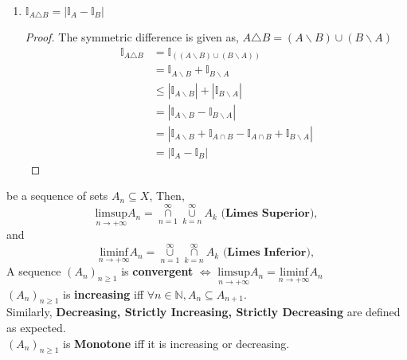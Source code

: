 \documentclass[letterpaper, 12pt]{article}
\newcommand{\1}{\mathds{1}}	%
\theoremstyle{definition}
\begin{document}
{\begin{enumerate}
\begin{proof}
\begin{align*}
            &= \mathds{I}_{A} (1 - \mathds{I}_{B}
        \end{align*}
    \end{proof}
    \item $\mathds{I}_{A \triangle B} = |\mathds{I}_{A} - \mathds{I}_{B}|$
    \begin{proof}
        The symmetric difference is given as, $A \triangle B = (A \backslash B) \cup (B \backslash A)$ 
        \begin{align*}
            \mathds{I}_{A \triangle B} &= \mathds{I}_{((A \backslash B) \cup (B \backslash A))} \\
            &=\mathds{I}_{A \backslash B} + \mathds{I}_{B \backslash A} \\
            &\leq |\mathds{I}_{A \backslash B}| + |\mathds{I}_{B \backslash A}| \\
            &=|\mathds{I}_{A \backslash B} - \mathds{I}_{B \backslash A}| \\
            &=|\mathds{I}_{A \backslash B} + \mathds{I}_{A \cap B} - \mathds{I}_{A \cap B} + \mathds{I}_{B \backslash A}| \\
            &=|\mathds{I}_{A} - \mathds{I}_{B}|
        \end{align*}
    \end{proof}
\end{enumerate}

 be a sequence of sets $A_n \subseteq X$, Then, \[\underset{n \to +\infty}{\mathrm{lim sup}} A_n = \overset{\infty}{ \underset{n=1}{\cap}} \overset{\infty}{ \underset{k=n}{\cup}} A_{k} \textbf{ (Limes Superior}),\]
and 
\[\underset{n \to +\infty}{\mathrm{lim inf}} A_n = \overset{\infty}{ \underset{n=1}{\cup}} \overset{\infty}{ \underset{k=n}{\cap}} A_{k} \textbf{ (Limes Inferior}),\]
A sequence $(A_n)_{n \geq 1}$ is \textbf{convergent} $\Longleftrightarrow$ $\underset{n \to +\infty}{\mathrm{lim sup}} A_n = \underset{n \to +\infty}{\mathrm{lim inf}} A_n$ \\
$(A_n)_{n \geq 1}$ is \textbf{increasing} iff $\forall n \in \mathbb{N}, A_n \subseteq A_{n +1}.$ \\
Similarly, \textbf{Decreasing, Strictly Increasing,  Strictly Decreasing} are defined as expected. \\
$(A_n)_{n \geq 1}$ is \textbf{Monotone} iff it is increasing or decreasing. \\


}
\end{document}
